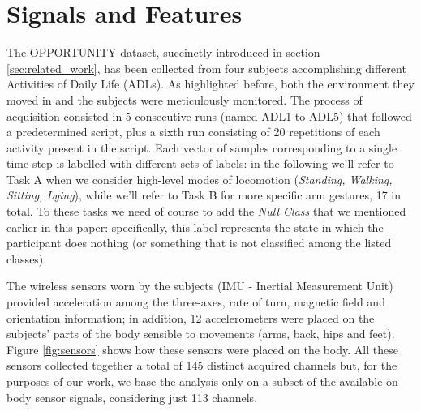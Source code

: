 \section{Signals and Features}
\label{sec:model}

The OPPORTUNITY dataset, succinctly introduced in section \ref{sec:related_work}, has been collected from four subjects accomplishing different Activities of Daily Life (ADLs). As highlighted before, both the environment they moved in and the subjects were meticulously monitored.
The process of acquisition consisted in 5 consecutive runs (named ADL1 to ADL5) that followed a predetermined script, plus a sixth run consisting of 20 repetitions of each activity present in the script. Each vector of samples corresponding to a single time-step is labelled with different sets of labels: in the following we'll refer to Task A when we consider high-level modes of locomotion (\textit{Standing, Walking, Sitting, Lying}), while we'll refer to Task B for more specific arm gestures, 17 in total. To these tasks we need of course to add the \textit{Null Class} that we mentioned earlier in this paper: specifically, this label represents the state in which the participant does nothing (or something that is not classified among the listed classes). 

The wireless sensors worn by the subjects (IMU - Inertial Measurement Unit) provided acceleration among the three-axes, rate of turn, magnetic field and orientation information; in addition, 12 accelerometers were placed on the subjects' parts of the body sensible to movements (arms, back, hips and feet). Figure \ref{fig:sensors} shows how these sensors were placed on the body. All these sensors collected together a total of 145 distinct acquired channels but, for the purposes of our work, we base the analysis only on a subset of the available on-body sensor signals, considering just 113 channels.

